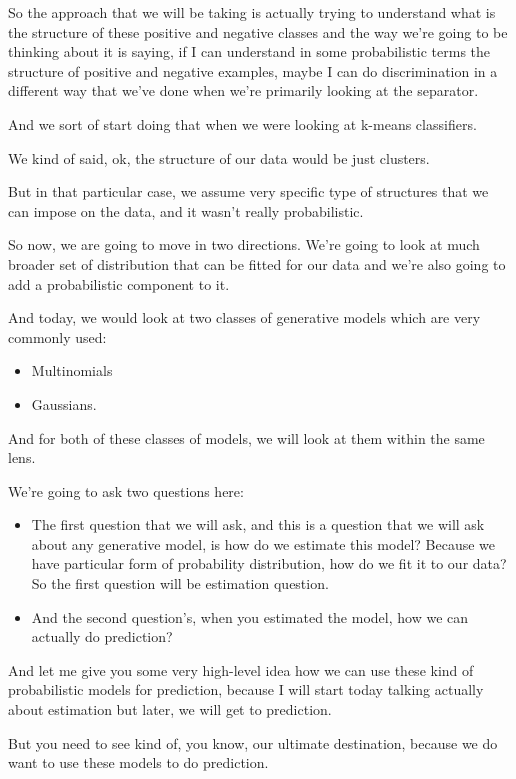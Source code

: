 \documentclass[a4paper, 12pt]{article}
\begin{document}
So the approach that we will be taking is actually trying to understand what is
the structure of these positive and negative classes and the way we're going to
be thinking about it is saying, if I can understand in some probabilistic terms
the structure of positive and negative examples, maybe I can do discrimination
in a different way that we've done when we're primarily looking at the
separator.

And we sort of start doing that when we were looking at k-means classifiers.

We kind of said, ok, the structure of our data would be just clusters.

But in that particular case, we assume very specific type of structures that we
can impose on the data, and it wasn't really probabilistic.

So now, we are going to move in two directions. We're going to look at much
broader set of distribution that can be fitted for our data and we're also going
to add a probabilistic component to it.

And today, we would look at two classes of generative models which are very
commonly used:

\begin{itemize}
\item Multinomials
\item Gaussians.
\end{itemize}

And for both of these classes of models, we will look at them within the same
lens.

We're going to ask two questions here:

\begin{itemize}
\item The first question that we will ask, and this is a question that we will ask
about any generative model, is how do we estimate this model? Because we have
particular form of probability distribution, how do we fit it to our data? So
the first question will be estimation question.
\item And the second question's, when you estimated the model, how we can actually
do prediction?
\end{itemize}

And let me give you some very high-level idea how we can use these kind of
probabilistic models for prediction, because I will start today talking actually
about estimation but later, we will get to prediction.

But you need to see kind of, you know, our ultimate destination, because we do
want to use these models to do prediction.
\end{document}
